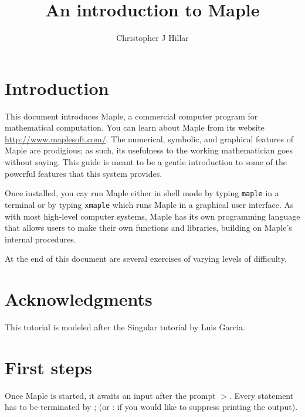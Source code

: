 \documentclass[12pt]{amsart}
\begin{document}
\title{An introduction to Maple}

\author{Christopher J Hillar}
\address{Department of Mathematics\\
         Texas A\&M University\\
         College Station\\
         TX \ 77843-3368\\
         USA}

\maketitle

\section*{Introduction}
This document introduces Maple, a commercial computer 
program for mathematical computation.  You can learn about Maple from 
its website \url{http://www.maplesoft.com/}.  The numerical, symbolic, and graphical
features of Maple are prodigious; as such, its usefulness to the working mathematician
goes without saying.  This guide is meant to be a gentle introduction to some of the
powerful features that this system provides.

Once installed, you cay run Maple either in shell mode by typing \texttt{maple} in a terminal or by typing
\texttt{xmaple} which runs Maple in a graphical user interface.
As with most high-level computer systems, Maple has its own programming language that allows
users to make their own functions and libraries, building on Maple's internal procedures.

At the end of this document are several exercises of varying levels of difficulty.
\section*{Acknowledgments}

This tutorial is modeled after the Singular tutorial by Luis Garcia. 


\section{First steps}

Once Maple is started, it awaits an input after the prompt $>$. Every statement has to be terminated by ; (or : if 
you would like to suppress printing the output).
\end{document}
